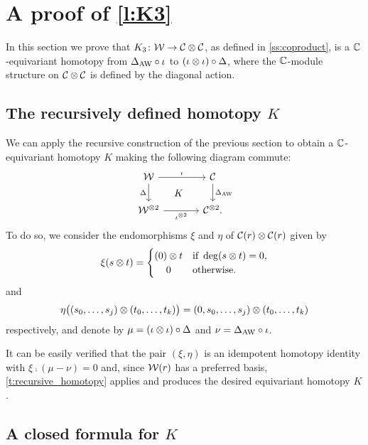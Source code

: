 
\section{A proof of \cref{l:K3}}\label{s:postponed}

In this section we prove that $K_3 \colon \mathcal{W} \to \mathcal{C} \otimes \mathcal{C}$, as defined in \cref{ss:coproduct}, is a $\mathbb{C}$-equivariant homotopy from $\Delta_{\operatorname{AW}} \mathbin{\circ} \iota$ to $(\iota \otimes \iota) \mathbin{\circ} \Delta$, where the $\mathbb{C}$-module structure on $\mathcal{C} \otimes \mathcal{C}$ is defined by the diagonal action.

\subsection{The recursively defined homotopy $K$}

We can apply the recursive construction of the previous section to obtain a $\mathbb{C}$-equivariant homotopy $K$ making the following diagram commute:
\begin{equation*}
	\begin{tikzcd}[column sep=large]
		\cW \arrow[r,"\iota"] \arrow[d,"\Delta"'] \arrow[dr,phantom,"K"]&
		\cC \arrow[d,"\Delta_{\AW}"] \\
		\cW^{\ot 2} \arrow[r,"\iota^{\ot 2}"'] &
		\cC^{\ot 2}.
	\end{tikzcd}
\end{equation*}
To do so, we consider the endomorphisms $\xi$ and $\eta$ of $\mathcal{C}(r) \otimes \mathcal{C}(r)$ given by
\[
\xi(s \ot t) =
\begin{cases}
	(0) \ot t & \text{if } \deg(s \ot t) = 0, \\
	\hfil0 & \text{otherwise}.
\end{cases}
\]
and
\[
\eta \big((s_0,\dots,s_j) \otimes (t_0,\dots,t_k)\big) = (0,s_0,\dots,s_j) \otimes (t_0,\dots,t_k)
\]
respectively, and denote by $\mu = (\iota \otimes \iota) \mathbin{\circ} \Delta$ and $\nu = \Delta_{\operatorname{AW}} \mathbin{\circ} \iota$.

It can be easily verified that the pair $(\xi,\eta)$ is an idempotent homotopy identity with $\xi \comp (\mu - \nu) = 0$ and, since $\mathcal{W}(r)$ has a preferred basis, \cref{t:recursive_homotopy} applies and produces the desired equivariant homotopy $K$.

\subsection{A closed formula for $K$}\label{ss:closed formula for K}

